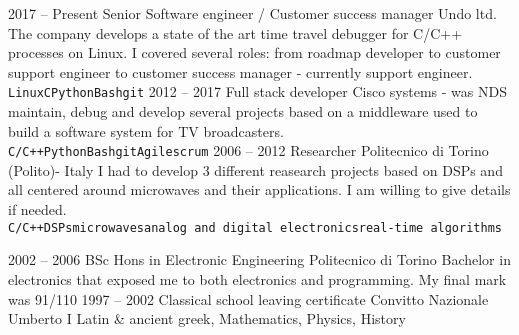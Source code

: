 \documentclass[8pt]{developercv} %
\begin{document}
\begin{entrylist}
	\entry
		{2017 -- Present}
		{Senior Software engineer / Customer success manager}
		{Undo ltd.}
		{The company develops a state of the art time travel debugger for C/C++ processes on Linux.
        I covered several roles: from roadmap developer to customer support engineer to customer
        success manager - currently support engineer.\\ \texttt{Linux}\slashsep\texttt{C}\slashsep\texttt{Python}\slashsep\texttt{Bash}\slashsep\texttt{git}}
	\entry
		{2012 -- 2017}
		{Full stack developer}
		{Cisco systems - was NDS}
		{maintain, debug and develop several projects based on a middleware used to build a software system for TV broadcasters.\\ \texttt{C/C++}\slashsep\texttt{Python}\slashsep\texttt{Bash}\slashsep\texttt{git}\slashsep\texttt{Agile}\slashsep\texttt{scrum}}
	\entry
		{2006 -- 2012}
		{Researcher}
		{Politecnico di Torino (Polito)- Italy}
		{I had to develop 3 different reasearch projects based on DSPs and all centered around microwaves and their applications. I am willing to give details if needed. \\
\texttt{C/C++}\slashsep\texttt{DSPs}\slashsep\texttt{microwaves}\slashsep\texttt{analog and digital electronics}\slashsep\texttt{real-time algorithms}}
\end{entrylist}



\begin{entrylist}
	\entry
		{2002 -- 2006}
		{BSc Hons in Electronic Engineering}
		{Politecnico di Torino}
		{Bachelor in electronics that exposed me to both electronics and programming. My final mark was 91/110}
	\entry
		{1997 -- 2002}
		{Classical school leaving certificate}
		{Convitto Nazionale Umberto I}
		{Latin \& ancient greek, Mathematics, Physics, History}
\end{entrylist}
\end{document}
